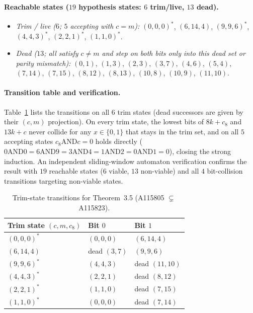 \documentclass[11pt]{article}
\begin{document}
\paragraph{Reachable states ($19$ hypothesis states: $6$ trim/live, $13$ dead).}
\begin{itemize}
  \item \emph{Trim / live ($6$; $5$ accepting with $c = m$):}
  $(0,0,0)^*$, $(6,14,4)$, $(9,9,6)^*$, $(4,4,3)^*$, $(2,2,1)^*$, $(1,1,0)^*$.
  \item \emph{Dead ($13$; all satisfy $c \ne m$ and step on both bits only into this dead set or parity mismatch):}
  $(0,1)$, $(1,3)$, $(2,3)$, $(3,7)$, $(4,6)$, $(5,4)$, $(7,14)$, $(7,15)$, $(8,12)$, $(8,13)$, $(10,8)$, $(10,9)$, $(11,10)$.
\end{itemize}

\paragraph{Transition table and verification.}
Table~\ref{tab:app-35} lists the transitions on all $6$ trim states (dead successors are given by their $(c, m)$ projection). On every trim state, the lowest bits of $8k + c_8$ and $13k + c$ never collide for any $x \in \{0,1\}$ that stays in the trim set, and on all $5$ accepting states $c_8 \mathbin{\mathrm{AND}} c = 0$ holds directly ($0 \mathbin{\mathrm{AND}} 0 = 6 \mathbin{\mathrm{AND}} 9 = 3 \mathbin{\mathrm{AND}} 4 = 1 \mathbin{\mathrm{AND}} 2 = 0 \mathbin{\mathrm{AND}} 1 = 0$), closing the strong induction. An independent sliding-window automaton verification confirms the result with $19$ reachable states ($6$ viable, $13$ non-viable) and all $4$ bit-collision transitions targeting non-viable states.

\begin{table}[ht]
\centering
\small
\begin{tabular}{lll}
\hline
Trim state $(c, m, c_8)$ & Bit $0$ & Bit $1$ \\
\hline
$(0,0,0)^*$ & $(0,0,0)$ & $(6,14,4)$ \\
$(6,14,4)$ & dead $(3,7)$ & $(9,9,6)$ \\
$(9,9,6)^*$ & $(4,4,3)$ & dead $(11,10)$ \\
$(4,4,3)^*$ & $(2,2,1)$ & dead $(8,12)$ \\
$(2,2,1)^*$ & $(1,1,0)$ & dead $(7,15)$ \\
$(1,1,0)^*$ & $(0,0,0)$ & dead $(7,14)$ \\
\hline
\end{tabular}
\caption{Trim-state transitions for Theorem~3.5 (A115805 $\subsetneq$ A115823).}
\label{tab:app-35}
\end{table}
\end{document}
